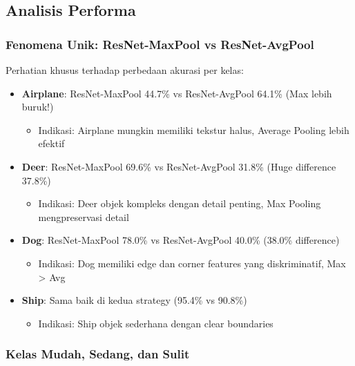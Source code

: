 \documentclass[12pt,a4paper]{report}
\begin{document}
\subsection{Analisis Performa}

\subsubsection{Fenomena Unik: ResNet-MaxPool vs ResNet-AvgPool}

Perhatian khusus terhadap perbedaan akurasi per kelas:

\begin{itemize}
    \item \textbf{Airplane}: ResNet-MaxPool 44.7\% vs ResNet-AvgPool 64.1\% (Max lebih buruk!)
    \begin{itemize}
        \item Indikasi: Airplane mungkin memiliki tekstur halus, Average Pooling lebih efektif
    \end{itemize}
    
    \item \textbf{Deer}: ResNet-MaxPool 69.6\% vs ResNet-AvgPool 31.8\% (Huge difference 37.8\%)
    \begin{itemize}
        \item Indikasi: Deer objek kompleks dengan detail penting, Max Pooling mengpreservasi detail
    \end{itemize}
    
    \item \textbf{Dog}: ResNet-MaxPool 78.0\% vs ResNet-AvgPool 40.0\% (38.0\% difference)
    \begin{itemize}
        \item Indikasi: Dog memiliki edge dan corner features yang diskriminatif, Max > Avg
    \end{itemize}
    
    \item \textbf{Ship}: Sama baik di kedua strategy (95.4\% vs 90.8\%)
    \begin{itemize}
        \item Indikasi: Ship objek sederhana dengan clear boundaries
    \end{itemize}
\end{itemize}

\subsubsection{Kelas Mudah, Sedang, dan Sulit}
\end{document}
